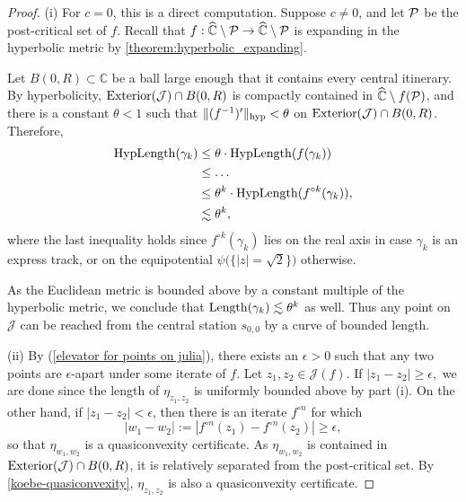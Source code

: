 \begin{proof} \leavevmode
(i) For $c=0$, this is a direct computation. 
Suppose $c \neq 0$, and let $\operatorname{\mathcal P}$ be the post-critical set of $f$.
Recall that $f: \widehat{\mathbb C} \setminus \operatorname{\mathcal P} \to \widehat{\mathbb C} \setminus \operatorname{\mathcal P}$
is expanding in the hyperbolic metric by \cref{theorem:hyperbolic_expanding}.

Let $B(0,R) \subset \mathbb{C}$ be a ball large enough that it contains every central itinerary. 
By hyperbolicity, $\operatorname{Exterior}(\mathcal{J}) \cap B(0,R)$ is compactly contained in $\widehat{\mathbb C} \setminus f(\operatorname{\mathcal P})$, and
there is a constant $\theta<1$ such that $\Vert (f^{-1})' \Vert_{\operatorname{hyp}}< \theta$ on $\operatorname{Exterior}(\mathcal{J}) \cap B(0,R)$. Therefore,
\begin{align*}
\operatorname{HypLength}(\gamma_k)  & \leq \theta \cdot \operatorname{HypLength}(f(\gamma_k))\\ & \leq  \dots
	\\ & \leq \theta^k \cdot \operatorname{HypLength}(f^{\circ k}(\gamma_k)),
	\\ & \lesssim \theta^k,
\end{align*}
where the last inequality holds since $f^{\circ k}(\gamma_k)$ lies 
on the real axis in case $\gamma_k$ is an express track, 
or on the equipotential $\psi \bigl (\{ |z| = \sqrt 2\} \bigr )$ otherwise.


As the Euclidean metric is bounded above by a constant multiple of the hyperbolic metric,
we conclude that $\operatorname{Length}(\gamma_k) \lesssim \theta^k$ as well.
Thus any point on $\mathcal J$ can be reached from the central station 
$s_{0,0}$ by a curve of bounded length.

(ii) By (\ref{elevator for points on julia}), 
there exists an $\epsilon>0$ such that any two points are $\epsilon$-apart 
under some iterate of $f$. 
Let $z_{1},z_{2}\in\mathcal{J}(f)$. If $ |z_{1}-z_{2} |\geq\epsilon,$ 
we are done since the length of $\eta_{z_1,z_2}$ is uniformly bounded above by part (i).
On the other hand, if 
$ |z_{1}-z_{2} |<\epsilon$,
then there is an iterate $f^{\circ n}$ for which
\begin{equation}
	|w_1-w_2|:= |f^{\circ n}(z_{1})-f^{\circ n}(z_{2}) |\geq\epsilon,
\end{equation}
so that $\eta_{w_1, w_2}$ is a quasiconvexity certificate.
As $\eta_{w_1, w_2}$ is contained in $\operatorname{Exterior}(\mathcal J) \cap B(0,R)$, it is relatively separated from the post-critical set.
By \cref{koebe-quasiconvexity}, $\eta_{z_1,z_2}$ is also a quasiconvexity certificate.
\end{proof}

